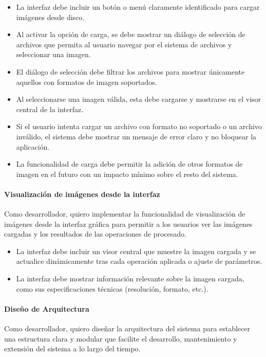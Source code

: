 \begin{itemize}[noitemsep]
	\item La interfaz debe incluir un botón o menú claramente identificado para cargar imágenes desde disco.
	\item Al activar la opción de carga, se debe mostrar un diálogo de selección de archivos que permita al usuario navegar por el sistema de archivos y seleccionar una imagen.
	\item El diálogo de selección debe filtrar los archivos para mostrar únicamente aquellos con formatos de imagen soportados.
	\item Al seleccionarse una imagen válida, esta debe cargarse y mostrarse en el visor central de la interfaz.
	\item Si el usuario intenta cargar un archivo con formato no soportado o un archivo inválido, el sistema debe mostrar un mensaje de error claro y no bloquear la aplicación.
	\item La funcionalidad de carga debe permitir la adición de otros formatos de imagen en el futuro con un impacto mínimo sobre el resto del sistema.
\end{itemize}

\newpage

\paragraph{Visualización de imágenes desde la interfaz} \label{hist:visualizacion_imagenes_interfaz}
Como desarrollador, quiero implementar la funcionalidad de visualización de imágenes desde la interfaz gráfica para
permitir a los usuarios ver las imágenes cargadas y los resultados de las operaciones de procesado.

\begin{itemize}[noitemsep]
	\item La interfaz debe incluir un visor central que muestre la imagen cargada y se actualice dinámicamente tras cada operación aplicada o ajuste de parámetros.
	\item La interfaz debe mostrar información relevante sobre la imagen cargada, como sus especificaciones técnicas (resolución, formato, etc.).
\end{itemize}

\paragraph{Diseño de Arquitectura} \label{hist:diseno_arquitectura}
Como desarrollador, quiero diseñar la arquitectura del sistema para establecer una estructura clara y modular que
facilite el desarrollo, mantenimiento y extensión del sistema a lo largo del tiempo.

